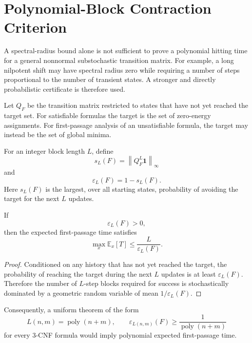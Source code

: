 \section{Polynomial-Block Contraction Criterion}
\label{sec:block-contraction}

A spectral-radius bound alone is not sufficient to prove a polynomial hitting
time for a general nonnormal substochastic transition matrix.  For example, a
long nilpotent shift may have spectral radius zero while requiring a number of
steps proportional to the number of transient states.  A stronger and directly
probabilistic certificate is therefore used.

Let $Q_F$ be the transition matrix restricted to states that have not yet
reached the target set.  For satisfiable formulas the target is the set of
zero-energy assignments.  For first-passage analysis of an unsatisfiable
formula, the target may instead be the set of global minima.

For an integer block length $L$, define
\begin{equation}
s_L(F)
=
\left\|Q_F^L\mathbf 1\right\|_\infty
\end{equation}
and
\begin{equation}
\varepsilon_L(F)=1-s_L(F).
\end{equation}
Here $s_L(F)$ is the largest, over all starting states, probability of avoiding
the target for the next $L$ updates.

\begin{theorem}
If
\begin{equation}
\varepsilon_L(F)>0,
\end{equation}
then the expected first-passage time satisfies
\begin{equation}
\boxed{
\max_x\mathbb E_x[T]
\le
\frac{L}{\varepsilon_L(F)}.
}
\end{equation}
\end{theorem}

\begin{proof}
Conditioned on any history that has not yet reached the target, the probability
of reaching the target during the next $L$ updates is at least
$\varepsilon_L(F)$.  Therefore the number of $L$-step blocks required for
success is stochastically dominated by a geometric random variable of mean
$1/\varepsilon_L(F)$.
\end{proof}

Consequently, a uniform theorem of the form
\begin{equation}
L(n,m)=\operatorname{poly}(n+m),
\qquad
\varepsilon_{L(n,m)}(F)
\ge
\frac{1}{\operatorname{poly}(n+m)}
\end{equation}
for every 3-CNF formula would imply polynomial expected first-passage time.

